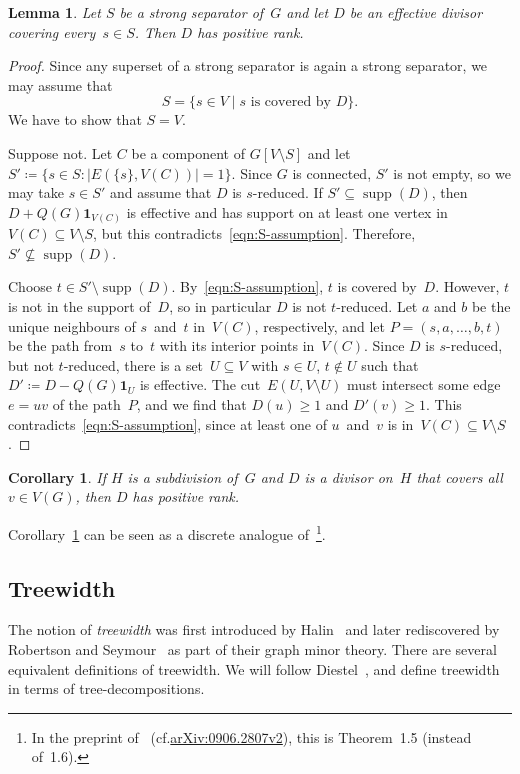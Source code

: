 \documentclass[10pt]{amsart}
\newtheorem{lemma}[theorem]{Lemma}
\newtheorem{coro}[theorem]{Corollary}
\providecommand{\cf}{cf.}
\newcommand{\one}{\ensuremath{\mathbf{1}}}
\DeclareMathOperator{\supp}{supp}
\begin{document}
\begin{lemma}\label{Luotype}
Let $S$ be a strong separator of~$G$ and let $D$ be an effective divisor covering every~$s\in S$. Then $D$ has positive rank. 
\end{lemma}
\begin{proof}
Since any superset of a strong separator is again a strong separator, we may assume that
\begin{equation}
	S=\{s\in V\mid \text{$s$ is covered by $D$}\}. \label{eqn:S-assumption}
\end{equation}
We have to show that $S=V$. 

Suppose not. Let $C$ be a component of $G[V\setminus S]$ and let $S'\coloneqq \{s\in S: |E(\{s\},V(C))|=1\}$. Since $G$ is connected, $S'$ is not empty, so we may take $s\in S'$ and assume that $D$ is $s$-reduced. If $S'\subseteq \supp(D)$, then $D+Q(G)\one_{V(C)}$ is effective and has support on at least one vertex in $V(C)\subseteq V\setminus S$, but this contradicts~\eqref{eqn:S-assumption}. Therefore, $S' \not\subseteq \supp(D)$. 

Choose $t\in S'\setminus \supp(D)$. By~\eqref{eqn:S-assumption}, $t$ is covered by~$D$. However, $t$ is not in the support of~$D$, so in particular $D$ is not $t$-reduced. Let $a$ and $b$ be the unique neighbours of $s$~and~$t$ in~$V(C)$, respectively, and let $P=(s,a,\ldots,b,t)$ be the path from~$s$ to~$t$ with its interior points in~$V(C)$. Since $D$ is $s$-reduced, but not $t$-reduced, there is a set~$U\subseteq V$ with $s\in U$, $t\not\in U$ such that $D'\coloneqq D-Q(G)\one_U$ is effective. The cut~$E(U,V\setminus U)$ must intersect some edge~$e=uv$ of the path~$P$, and we find that $D(u)\geq 1$ and $D'(v)\geq 1$. This contradicts~\eqref{eqn:S-assumption}, since at least one of $u$~and~$v$ is in~$V(C)\subseteq V\setminus S$.
\end{proof}

\begin{coro}
\label{rankdetermining}
If $H$ is a subdivision of~$G$ and $D$ is a divisor on~$H$ that covers all~$v\in V(G)$, then $D$ has positive rank.
\end{coro}

Corollary~\ref{rankdetermining} can be seen as a discrete analogue of~\cite[Theorem~1.6]{Luo2011}\footnote{In the preprint of~\cite{Luo2011} (\cf \href{https://arxiv.org/abs/0906.2807v2}{arXiv:0906.2807v2}), this is Theorem~1.5 (instead of~1.6).}.

\subsection{Treewidth}
The notion of \emph{treewidth} was first introduced by Halin~\cite{Halin1976} and later rediscovered by Robertson and Seymour~\cite{RobertsonSeymour1990} as part of their graph minor theory. There are several equivalent definitions of treewidth. We will follow Diestel~\cite{DiestelGraphTheory}, and define treewidth in terms of tree-decompositions.
\end{document}
